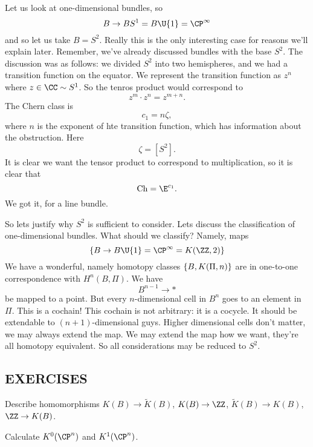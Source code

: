 Let us look at one-dimensional bundles, so
\begin{equation}
B\to BS^{1}=B\U{1}=\CP^{\infty}
\end{equation}
and so let us take $B=S^2$. Really this is the only interesting
case for reasons we'll explain later. Remember, we've already
discussed bundles with the base $S^{2}$. The discussion was as
follows: we divided $S^{2}$ into two hemispheres, and we had a
transition function on the equator. We represent the transition
function as $z^{n}$ where $z\in\CC\homotopic S^{1}$. So the
tenros product would correspond to
\begin{equation}
z^{m}\cdot z^{n}=z^{m+n}.
\end{equation}
The Chern class is
\begin{equation}
c_{1}=n\zeta,
\end{equation}
where $n$ is the exponent of hte transition function, which has
information about the obstruction. Here
\begin{equation}
\zeta=[S^{2}].
\end{equation}
It is clear we want the tensor product to correspond to
multiplication, so it is clear that
\begin{equation}
\chernChar = \E^{c_{1}}.
\end{equation}
We got it, for a line bundle.

So lets justify why $S^{2}$ is sufficient to consider. Lets
discuss the classification of one-dimensional bundles. What
should we classify? Namely, maps
\begin{equation}
\{B\to B\U{1}=\CP^{\infty}=K(\ZZ,2)\}
\end{equation}
We have a wonderful, namely homotopy classes
$\homotopyClass(B,{K(\Pi,n)})$ are in one-to-one correspondence
with $H^{n}(B,\Pi)$. We have
\begin{equation}
B^{n-1}\to *
\end{equation}
be mapped to a point. But every $n$-dimensional cell in $B^{n}$
goes to an element in $\Pi$. This is a cochain! This cochain is
not arbitrary: it is a cocycle. It should be extendable to
$(n+1)$-dimensional guys. Higher dimensional cells don't matter,
we may always extend the map. We may extend the map how we want,
they're all homotopy equivalent. So all considerations may be
reduced to $S^{2}$.

\subsection*{EXERCISES}
\begin{xca}
Describe homomorphisms $K(B)\to\widetilde{K}(B)$, $K(B)\to\ZZ$,
$\widetilde{K}(B)\to K(B)$, $\ZZ\to K(B)$.
\end{xca}
\begin{xca}
Calculate $K^{0}(\CP^n)$ and $K^{1}(\CP^n)$.
\end{xca}
